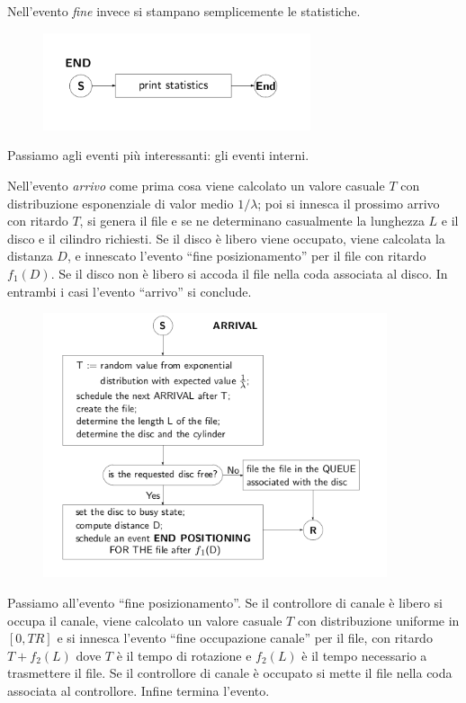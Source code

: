 \documentclass[11pt]{book}
\begin{document}
Nell'evento {\em fine} invece si stampano semplicemente le
statistiche.

\begin{figure}[H]
  \centering
  \includegraphics[width=0.7\textwidth]{images/cap11fig28_2.png}
\end{figure}

Passiamo agli eventi pi\`u interessanti: gli eventi interni.

Nell'evento {\em arrivo} come prima cosa viene calcolato un valore
casuale $T$ con distribuzione esponenziale di valor medio $1/\lambda$;
poi si innesca il prossimo arrivo con ritardo $T$, si genera il file e
se ne determinano casualmente la lunghezza $L$ e il disco e il
cilindro richiesti. Se il disco \`e libero viene occupato, viene
calcolata la distanza $D$, e innescato l'evento ``fine
posizionamento'' per il file con ritardo $f_1(D)$. Se il disco non \`e
libero si accoda il file nella coda associata al disco. In entrambi i
casi l'evento ``arrivo'' si conclude.

\begin{figure}[H]
  \centering
  \includegraphics[width=0.9\textwidth]{images/cap11fig29.png}
\end{figure}

Passiamo all'evento ``fine posizionamento''. Se il controllore di
canale \`e libero si occupa il canale, viene calcolato un valore
casuale $T$ con distribuzione uniforme in $[0,TR]$ e si innesca
l'evento ``fine occupazione canale'' per il file, con ritardo
$T+f_2(L)$ dove $T$ \`e il tempo di rotazione e $f_2(L)$ \`e il tempo
necessario a trasmettere il file. Se il controllore di canale \`e
occupato si mette il file nella coda associata al controllore. Infine
termina l'evento.
\end{document}
